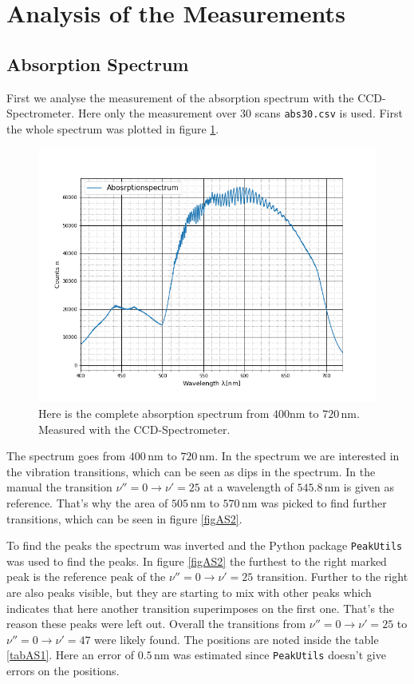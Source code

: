 \section{Analysis of the Measurements}
\subsection{Absorption Spectrum}
First we analyse the measurement of the absorption spectrum with the CCD-Spectrometer. Here only the measurement over $30$ scans \verb|abs30.csv| is used. First the whole spectrum was plotted in figure \ref{figAS1}.
\begin{figure}[ht]
	\includegraphics[scale=0.5]{Bild/AS_1.png}
	\centering
	\caption[Complete Absorption Spectrum]{\small Here is the complete absorption spectrum from $400$nm to $720$\,nm. Measured with the CCD-Spectrometer.}
	\label{figAS1}
\end{figure}
The spectrum goes from $400\,$nm to $720$\,nm. In the spectrum we are interested in the vibration transitions, which can be seen as dips in the spectrum. In the manual\cite{Anleitung} the transition $\nu''=0\rightarrow \nu'=25$ at a wavelength of $545.8\,$nm is given as reference. That's why the area of $505\,$nm to $570\,$nm was picked to find further transitions, which can be seen in figure \ref{figAS2}.\par
To find the peaks the spectrum was inverted and the Python package \verb|PeakUtils| was used to find the peaks. In figure \ref{figAS2} the furthest to the right marked peak is the reference peak of the $\nu''=0\rightarrow \nu'=25$ transition. Further to the right are also peaks visible, but they are starting to mix with other peaks which indicates that here another transition superimposes on the first one. That's the reason these peaks were left out. Overall the transitions from $\nu''=0\rightarrow \nu'=25$ to $\nu''=0\rightarrow \nu'=47$ were likely found. The positions are noted inside the table \ref{tabAS1}. Here an error of $0.5\,$nm was estimated since \verb|PeakUtils|\cite{Peak} doesn't give errors on the positions. \par
